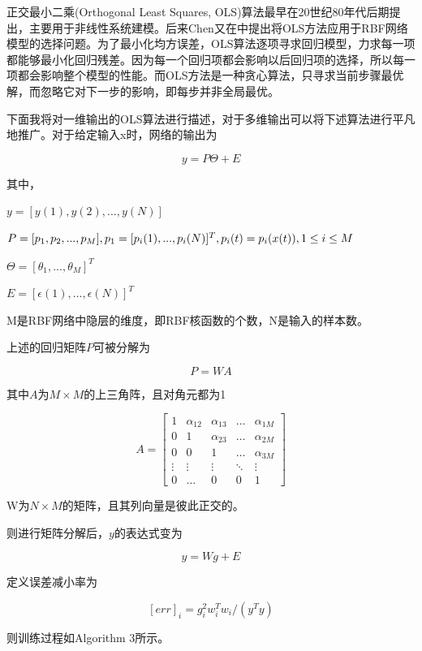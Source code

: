 \documentclass[twocolumn]{article}
\begin{document}
正交最小二乘(Orthogonal Least Squares, OLS)算法\cite{soton251147}最早在20世纪80年代后期提出，主要用于非线性系统建模。后来Chen又在\cite{80341}中提出将OLS方法应用于RBF网络模型的选择问题。为了最小化均方误差，OLS算法逐项寻求回归模型，力求每一项都能够最小化回归残差。因为每一个回归项都会影响以后回归项的选择，所以每一项都会影响整个模型的性能。而OLS方法是一种贪心算法，只寻求当前步骤最优解，而忽略它对下一步的影响，即每步并非全局最优。

下面我将对一维输出的OLS算法进行描述，对于多维输出可以将下述算法进行平凡地推广。对于给定输入x时，网络的输出为

$$y = P\Theta + E$$

其中，

$y = [y(1), y(2), ..., y(N)]$

$P = [p_1, p_2, ..., p_M], p_1 = [p_i(1), ..., p_i(N)]^T, \\p_i(t) = p_i(x(t)), 1\leq i \leq M$

$\Theta = [\theta_1, ..., \theta_M]^T$

$E = [\epsilon(1), ..., \epsilon(N)]^T$

M是RBF网络中隐层的维度，即RBF核函数的个数，N是输入的样本数。

上述的回归矩阵$P$可被分解为

$$P=WA$$

其中$A$为$M\times M$的上三角阵，且对角元都为1

$$A = \begin{bmatrix}
    1 & \alpha_{12} & \alpha_{13} & \dots  & \alpha_{1M} \\
    0 & 1 & \alpha_{23} & \dots  & \alpha_{2M} \\
    0 & 0 & 1 & \dots  & \alpha_{3M} \\
    \vdots & \vdots & \vdots & \ddots & \vdots \\
    0 & \dots & 0 & 0  & 1
\end{bmatrix}$$

W为$N\times M$的矩阵，且其列向量是彼此正交的。

则进行矩阵分解后，$y$的表达式变为

$$y = Wg + E$$

定义误差减小率为

$$[err]_i = g_i^2w_i^Tw_i/(y^Ty)$$

则训练过程如Algorithm 3所示。
\end{document}
